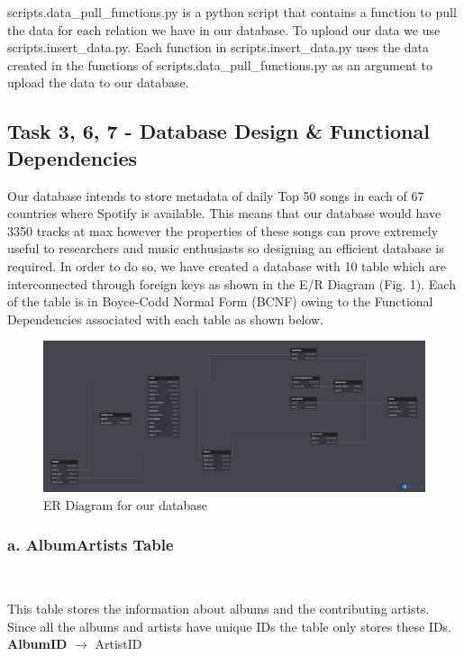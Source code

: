 \documentclass[conference]{IEEEtran}
\begin{document}
scripts.data\_pull\_functions.py is a python script that contains a function to pull the data for each relation we have in our database.  To upload our data we use scripts.insert\_data.py.  Each function in scripts.insert\_data.py uses the data created in the functions of scripts.data\_pull\_functions.py as an argument to upload the data to our database.

\subsection{\textbf{Task 3, 6, 7} - Database Design \& Functional Dependencies}

Our database intends to store metadata of daily Top 50 songs in each of 67 countries where Spotify is available. This means that our database would have 3350 tracks at max however the properties of these songs can prove extremely useful to researchers and music enthusiasts so designing an efficient database is required. In order to do so, we have created a database with 10 table which are interconnected through foreign keys as shown in the E/R Diagram (Fig. 1). Each of the table is in Boyce-Codd Normal Form (BCNF) owing to the Functional Dependencies associated with each table as shown below.  

\begin{figure}
    \includegraphics[width=\linewidth]{el_diagram.png}
    \caption{ER Diagram for our database}
    \label{Fig:ER Diagram}
\end{figure}

\subsubsection*{a. \textbf{AlbumArtists} Table} \

This table stores the information about albums and the contributing artists. Since all the albums and artists have unique IDs the table only stores these IDs. \linebreak \linebreak
\textbf{AlbumID} $\to$ ArtistID \linebreak
\end{document}

